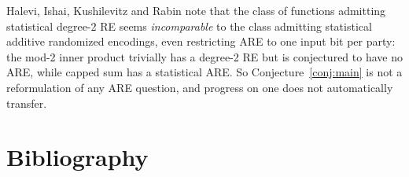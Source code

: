 \documentclass{aicr-conjecture}
\begin{document}
\begin{remark}
Halevi, Ishai, Kushilevitz and Rabin note that the class of functions
admitting statistical degree-2 RE seems \emph{incomparable} to the class
admitting statistical additive randomized encodings, even restricting ARE
to one input bit per party: the mod-2 inner product trivially has a
degree-2 RE but is conjectured to have no ARE, while capped sum has a
statistical ARE\@. So Conjecture~\ref{conj:main} is not a reformulation of
any ARE question, and progress on one does not automatically transfer.
\end{remark}

\section{Bibliography}
\end{document}
